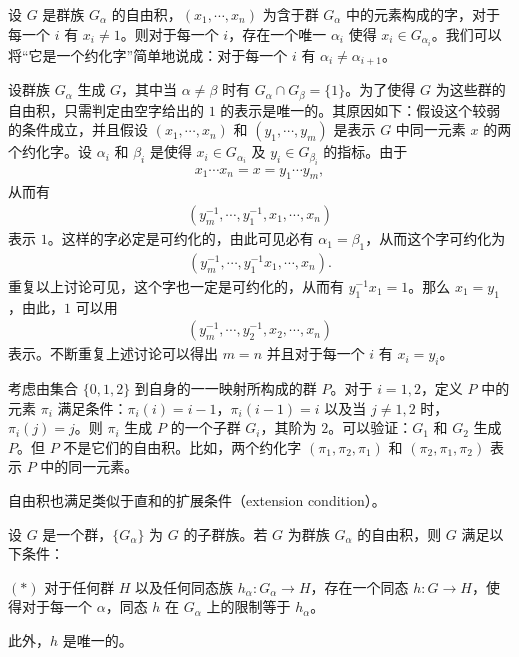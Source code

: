 \documentclass[../../main.tex]{subfiles}
\begin{document}
设 $G$ 是群族 $G_\alpha$ 的自由积，$(x_1,\cdots,x_n)$ 为含于群 $G_\alpha$ 中的元素构成的字，对于每一个 $i$ 有 $x_i\neq 1$。则对于每一个 $i$，存在一个唯一 $\alpha_i$ 使得 $x_i\in G_{\alpha_i}$。我们可以将“它是一个约化字”简单地说成：对于每一个 $i$ 有 $\alpha_i\neq\alpha_{i+1}$。

设群族 $G_\alpha$ 生成 $G$，其中当 $\alpha\neq\beta$ 时有 $G_\alpha\cap G_\beta=\{1\}$。为了使得 $G$ 为这些群的自由积，只需判定由空字给出的 $1$ 的表示是唯一的。其原因如下：假设这个较弱的条件成立，并且假设 $(x_1,\cdots,x_n)$ 和 $(y_1,\cdots,y_m)$ 是表示 $G$ 中同一元素 $x$ 的两个约化字。设 $\alpha_i$ 和 $\beta_i$ 是使得 $x_i\in G_{\alpha_i}$ 及 $y_i\in G_{\beta_i}$ 的指标。由于
\begin{align*}
x_1\cdots x_n=x=y_1\cdots y_m,
\end{align*}
从而有
\begin{align*}
(y_m^{-1},\cdots,y_1^{-1},x_1,\cdots,x_n)
\end{align*}
表示 $1$。这样的字必定是可约化的，由此可见必有 $\alpha_1=\beta_1$，从而这个字可约化为
\begin{align*}
(y_m^{-1},\cdots,y_1^{-1}x_1,\cdots,x_n).
\end{align*}
重复以上讨论可见，这个字也一定是可约化的，从而有 $y_1^{-1}x_1=1$。那么 $x_1=y_1$，由此，$1$ 可以用
\begin{align*}
(y_m^{-1},\cdots,y_2^{-1},x_2,\cdots,x_n)
\end{align*}
表示。不断重复上述讨论可以得出 $m=n$ 并且对于每一个 $i$ 有 $x_i=y_i$。

\begin{example}\label{example:ch11-permutation-group}
考虑由集合 $\{0,1,2\}$ 到自身的一一映射所构成的群 $P$。对于 $i=1,2$，定义 $P$ 中的元素 $\pi_i$ 满足条件：$\pi_i(i)=i-1$，$\pi_i(i-1)=i$ 以及当 $j\neq 1,2$ 时，$\pi_i(j)=j$。则 $\pi_i$ 生成 $P$ 的一个子群 $G_i$，其阶为 $2$。可以验证：$G_1$ 和 $G_2$ 生成 $P$。但 $P$ 不是它们的自由积。比如，两个约化字 $(\pi_1,\pi_2,\pi_1)$ 和 $(\pi_2,\pi_1,\pi_2)$ 表示 $P$ 中的同一元素。
\end{example}

自由积也满足类似于直和的扩展条件（extension condition）。

\begin{lemma}[自由积的扩展条件]\label{lemma:ch11-extension-condition}
设 $G$ 是一个群，$\{G_\alpha\}$ 为 $G$ 的子群族。若 $G$ 为群族 $G_\alpha$ 的自由积，则 $G$ 满足以下条件：

$(*)$ 对于任何群 $H$ 以及任何同态族 $h_\alpha:G_\alpha\to H$，存在一个同态 $h:G\to H$，使得对于每一个 $\alpha$，同态 $h$ 在 $G_\alpha$ 上的限制等于 $h_\alpha$。

此外，$h$ 是唯一的。
\end{lemma}
\end{document}
